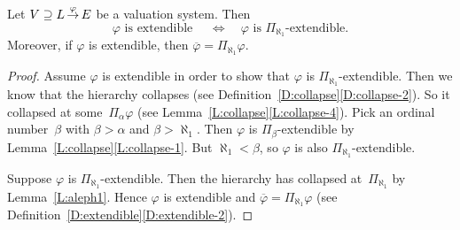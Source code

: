 \documentclass[main.tex]{subfiles}
\begin{document}
%
%
%
\begin{cor}
\label{C:aleph1}
Let $V \supseteq L\,\smash{\stackrel{\varphi}{\rightarrow}}\,E$ be a valuation system. Then
\begin{equation*}
\varphi\text{ is extendible }
\quad\iff\quad
\varphi\text{ is $\Pi_{\aleph_1}$-extendible.}
\end{equation*}
Moreover,
if $\varphi$ is extendible,
then $\overline\varphi = \Pi_{\aleph_1}\varphi$.
\end{cor}
\begin{proof}
Assume $\varphi$ is extendible
in order to show that $\varphi$ is $\Pi_{\aleph_1}$-extendible.
Then we know that the hierarchy collapses 
(see Definition~\ref{D:collapse}\ref{D:collapse-2}).
So it collapsed at some~$\Pi_\alpha \varphi$
(see Lemma~\ref{L:collapse}\ref{L:collapse-4}).
Pick an ordinal number~$\beta$ with $\beta > \alpha$
and $\beta > \aleph_1$.
Then $\varphi$ is $\Pi_\beta$-extendible
by Lemma~\ref{L:collapse}\ref{L:collapse-1}.
But $\aleph_1 <\beta$,
so $\varphi$ is also $\Pi_{\aleph_1}$-extendible.

Suppose $\varphi$ is $\Pi_{\aleph_1}$-extendible.
Then the hierarchy has collapsed at~$\Pi_{\aleph_1}$
by Lemma~\ref{L:aleph1}.
Hence 
$\varphi$ is extendible
and  $\overline\varphi = \Pi_{\aleph_1}\varphi$
(see Definition~\ref{D:extendible}\ref{D:extendible-2}).
\end{proof}
\end{document}
